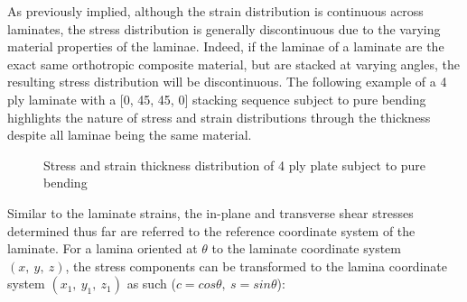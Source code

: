 As previously implied, although the strain distribution is continuous across laminates, the stress distribution is generally discontinuous due to the varying material properties of the laminae. Indeed, if the laminae of a laminate are the exact same orthotropic composite material, but are stacked at varying angles, the resulting stress distribution will be discontinuous. The following example of a 4 ply laminate with a [0, 45, 45, 0] stacking sequence subject to pure bending highlights the nature of stress and strain distributions through the thickness despite all laminae being the same material.

\begin{figure}[H]
	\caption{\label{composite_stress_strain}Stress and strain thickness distribution of 4 ply plate subject to pure bending  \cite{nasanettles1994}}
\end{figure}

Similar to the laminate strains, the in-plane and transverse shear stresses determined thus far are referred to the reference coordinate system of the laminate. For a lamina oriented at $\theta$ to the laminate coordinate system $(x,\ y,\ z)$, the stress components can be transformed to the lamina coordinate system $(x_1,\ y_1,\ z_1)$ as such ($c = cos\theta,\ s = sin\theta$):

